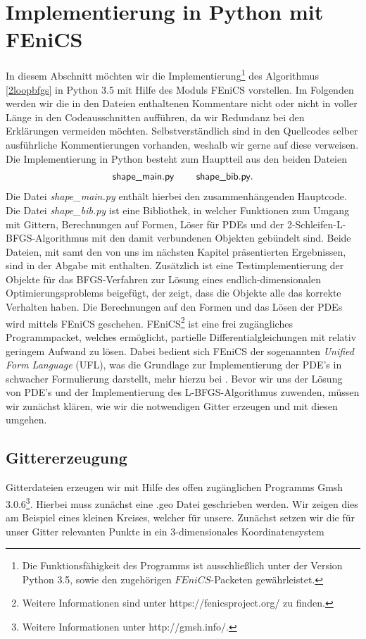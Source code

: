 
\section{Implementierung in Python mit FEniCS}\label{Chapter_implementation}

In diesem Abschnitt möchten wir die Implementierung\footnote{Die Funktionsfähigkeit des Programms ist ausschließlich unter der Version Python 3.5, sowie den zugehörigen $FEniCS$-Packeten gewährleistet.} des Algorithmus \ref{2loopbfgs} in Python 3.5 mit Hilfe des Moduls FEniCS vorstellen. Im Folgenden werden wir die in den Dateien enthaltenen Kommentare nicht oder nicht in voller Länge in den Codeausschnitten aufführen, da wir Redundanz bei den Erklärungen vermeiden möchten. Selbstverständlich sind in den Quellcodes selber ausführliche Kommentierungen vorhanden, weshalb wir gerne auf diese verweisen. Die Implementierung in Python besteht zum Hauptteil aus den beiden Dateien
\begin{align*}
\textsf{shape\_main.py} \hspace{0.8cm} \textsf{shape\_bib.py}.
\end{align*}
Die Datei \textit{shape\_main.py} enthält hierbei den zusammenhängenden Hauptcode. Die Datei \textit{shape\_bib.py} ist eine Bibliothek, in welcher Funktionen zum Umgang mit Gittern, Berechnungen auf Formen, Löser für PDEs und der 2-Schleifen-L-BFGS-Algorithmus mit den damit verbundenen Objekten gebündelt sind. 
Beide Dateien, mit samt den von uns im nächsten Kapitel präsentierten Ergebnissen, sind in der Abgabe mit enthalten. Zusätzlich ist eine Testimplementierung der Objekte für das BFGS-Verfahren zur Lösung eines endlich-dimensionalen Optimierungsproblems beigefügt, der zeigt, dass die Objekte alle das korrekte Verhalten haben. Die Berechnungen auf den Formen und das Lösen der PDEs wird mittels FEniCS geschehen.
FEniCS\footnote{Weitere Informationen sind unter https://fenicsproject.org/ zu finden.} ist eine frei zugängliches Programmpacket, welches ermöglicht, partielle Differentialgleichungen mit relativ geringem Aufwand zu lösen. Dabei bedient sich FEniCS der sogenannten \textit{Unified Form Language} (UFL), was die Grundlage zur Implementierung der PDE's in schwacher Formulierung darstellt, mehr hierzu bei \cite{Unifiedformlanguage}. 
Bevor wir uns der Lösung von PDE's und der Implementierung des L-BFGS-Algorithmus zuwenden, müssen wir zunächst klären, wie wir die notwendigen Gitter erzeugen und mit diesen umgehen.

\subsection{Gittererzeugung}
\label{meshgeneration}
Gitterdateien erzeugen wir mit Hilfe des offen zugänglichen Programms \textsf{Gmsh 3.0.6}\footnote{Weitere Informationen unter http://gmsh.info/.}. Hierbei muss  zunächst eine \textsf{.geo} Datei geschrieben werden. Wir zeigen dies am Beispiel eines kleinen Kreises, welcher für unsere.
Zunächst setzen wir die für unser Gitter relevanten Punkte in ein 3-dimensionales Koordinatensystem

